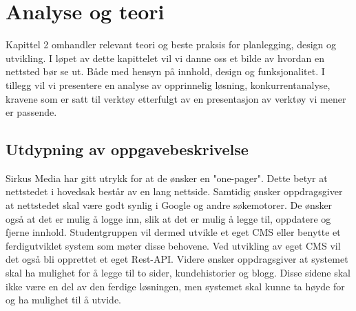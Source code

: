 \cleardoublepage
\chapter{Analyse og teori}
\label{chap:analysis}



Kapittel 2 omhandler relevant teori og beste praksis for planlegging, design og utvikling. I løpet av dette kapittelet vil vi danne oss et bilde av hvordan en nettsted bør se ut. Både med hensyn på innhold, design og funksjonalitet. I tillegg vil vi presentere en analyse av opprinnelig løsning, konkurrentanalyse, kravene som er satt til verktøy etterfulgt av en presentasjon av verktøy vi mener er passende.

\section{Utdypning av oppgavebeskrivelse}
Sirkus Media har gitt utrykk for at de ønsker en "one-pager". Dette betyr at nettstedet i hovedsak består av en lang nettside. Samtidig ønsker oppdragsgiver at nettstedet skal være godt synlig i Google og andre søkemotorer. De ønsker også at det er mulig å logge inn, slik at det er mulig å legge til, oppdatere og fjerne innhold. Studentgruppen vil dermed utvikle et eget CMS eller benytte et ferdigutviklet system som møter disse behovene. Ved utvikling av eget CMS vil det også bli opprettet et eget Rest-API. Videre ønsker oppdragsgiver at systemet skal ha mulighet for å legge til to sider, kundehistorier og blogg. Disse sidene skal ikke være en del av den ferdige løsningen, men systemet skal kunne ta høyde for og ha mulighet til å utvide.

